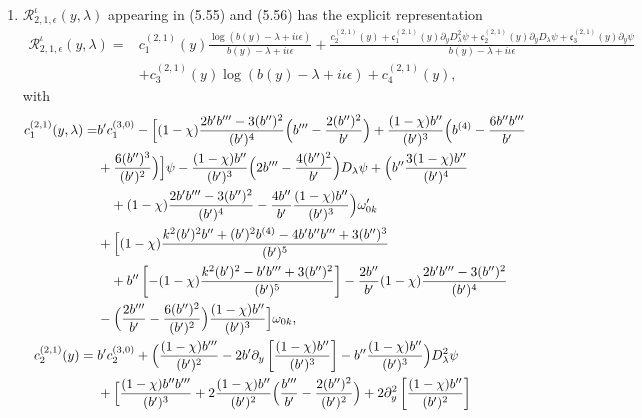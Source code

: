 \documentclass[reqno,11pt]{amsart}
\numberwithin{equation}{section}
\numberwithin{equation}{section} %
\begin{document}
\begin{enumerate}
\item $\mathcal{R}_{2,1,\epsilon}^\iota(y,\lambda)$ appearing in (5.55) and (5.56) has the explicit representation
    \begin{equation}\label{ndR21}
        \begin{split}
            \mathcal{R}_{2,1,\epsilon}^{\iota}(y,\lambda)=&c_1^{(2,1)}(y)\frac{\log(b(y)-\lambda+i\iota\epsilon)}{b(y)-\lambda+i\iota\epsilon}+\frac{c_2^{(2,1)}(y)+\mathfrak{c}_1^{(2,1)}(y)\partial_yD_\lambda^2\psi+\mathfrak{c}_2^{(2,1)}(y)\partial_yD_\lambda\psi+\mathfrak{c}_3^{(2,1)}(y)\partial_y\psi}{b(y)-\lambda+i\iota\epsilon} \\
            &+c_3^{(2,1)}(y)\log(b(y)-\lambda+i\iota\epsilon)+c_4^{(2,1)}(y),
        \end{split}
    \end{equation}
with
\begin{align}
  c_1^{(2,1)}(y,\lambda)=&b'c_1^{(3,0)} -\Bigl[(1-\chi)\frac{2b'b'''-3(b'')^2}{(b')^4}\Bigl(b'''-\frac{2(b'')^2}{b'}\Bigr) +\frac{(1-\chi)b''}{(b')^3}\Bigl(b^{(4)}-\frac{6b''b'''}{b'} \notag\\
 &+\frac{6(b'')^3}{(b')^2}\Bigr)\Bigr]\psi -\frac{(1-\chi)b''}{(b')^3}\Bigl(2b'''-\frac{4(b'')^2}{b'}\Bigr)D_\lambda\psi +\Bigl(b''\frac{3(1-\chi)b''}{(b')^4} \notag\\
 &\quad +(1-\chi)\frac{2b'b'''-3(b'')^2}{(b')^4}-\frac{4b''}{b'}\frac{(1-\chi)b''}{(b')^3}\Bigr)\omega_{0k}' \notag\\
 &+\Bigl[(1-\chi)\frac{k^2(b')^2b''+(b')^2b^{(4)}-4b'b''b'''+3(b'')^3}{(b')^5} \notag\\
 &\quad +b''\left[-(1-\chi)\frac{k^2(b')^2-b'b'''+3(b'')^2}{(b')^5}\right]-\frac{2b''}{b'}(1-\chi)\frac{2b'b'''-3(b'')^2}{(b')^4} \notag\\
 &-\Bigl(\frac{2b'''}{b'}-\frac{6(b'')^2}{(b')^2}\Bigr)\frac{(1-\chi)b''}{(b')^3}\Bigr]\omega_{0k}, \notag\\
 c_2^{(2,1)}(y)={}&b'c_2^{(3,0)} +\Bigl(\frac{(1-\chi)b'''}{(b')^2} -2b'\partial_y\left[\frac{(1-\chi)b''}{(b')^3}\right] -b''\frac{(1-\chi)b''}{(b')^3}\Bigr)D_\lambda^2\psi \notag\\
 &+\Bigl[\frac{(1-\chi)b''b'''}{(b')^3} +2\frac{(1-\chi)b''}{(b')^2}\Bigl(\frac{b'''}{b'}-\frac{2(b'')^2}{(b')^2}\Bigr) +2\partial_y^2\left[\frac{(1-\chi)b''}{(b')^2}\right] \notag\\

\end{align}
\end{enumerate}
\end{document}

